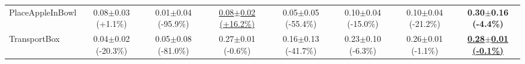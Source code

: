 \begin{table}[htbp]
\begin{adjustbox}{max width=\textwidth}
\begin{tabular}{l*{7}{c}}
PlaceAppleInBowl & 0.08$\pm$0.03 \scriptsize{(+1.1\%)} & 0.01$\pm$0.04 \scriptsize{(-95.9\%)} & \underline{0.08$\pm$0.02 \scriptsize{(+16.2\%)}} & 0.05$\pm$0.05 \scriptsize{(-55.4\%)} & 0.10$\pm$0.04 \scriptsize{(-15.0\%)} & 0.10$\pm$0.04 \scriptsize{(-21.2\%)} & \textbf{0.30$\pm$0.16 \scriptsize{(-4.4\%)}} \\
TransportBox & 0.04$\pm$0.02 \scriptsize{(-20.3\%)} & 0.05$\pm$0.08 \scriptsize{(-81.0\%)} & 0.27$\pm$0.01 \scriptsize{(-0.6\%)} & 0.16$\pm$0.13 \scriptsize{(-41.7\%)} & 0.23$\pm$0.10 \scriptsize{(-6.3\%)} & 0.26$\pm$0.01 \scriptsize{(-1.1\%)} & \textbf{\underline{0.28$\pm$0.01 \scriptsize{(-0.1\%)}}} \\
\bottomrule
\end{tabular}
\end{adjustbox}
\end{table}

